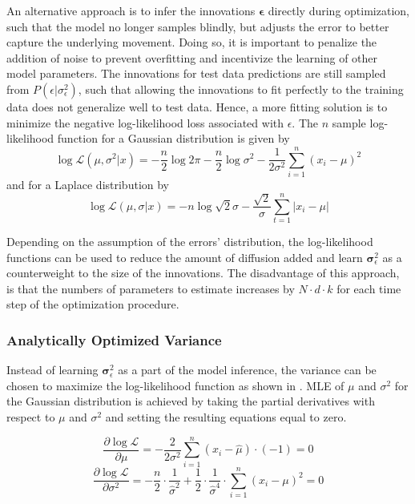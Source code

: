        An alternative approach is to infer the innovations $\bm{\epsilon}$ directly during optimization, such that the model no longer samples blindly, but adjusts the error to better capture the underlying movement. 
        Doing so, it is important to penalize the addition of noise to prevent overfitting and incentivize the learning of other model parameters. The innovations for test data predictions are still sampled from $P(\epsilon|\sigma_\epsilon^2)$, such that allowing the innovations to fit perfectly to the training data does not generalize well to test data. Hence, a more fitting solution is to minimize the negative log-likelihood loss associated with $\epsilon$. The $n$ sample log-likelihood function for a Gaussian distribution is given by
        \begin{equation}\label{error-gaussian-log-loss}
            \log\mathcal{L}(\mu, \sigma^2\vert x) = -\frac{n}{2}\log2\pi - \frac{n}{2}\log\sigma^2 - \frac{1}{2\sigma^2}\sum_{i=1}^n (x_i - \mu)^2
        \end{equation}
        and for a Laplace distribution by
        \begin{equation}\label{error-laplace-log-loss}
            \log\mathcal{L}(\mu,\sigma\vert x)=-n\log\sqrt{2}\sigma -\frac{\sqrt{2}}{\sigma}\sum_{t=1}^n |x_i-\mu|
        \end{equation}
    
        Depending on the assumption of the errors' distribution, the log-likelihood functions can be used to reduce the amount of diffusion added and learn $\bm{\sigma}_\epsilon^2$ as a counterweight to the size of the innovations. The disadvantage of this approach, is that the numbers of parameters to estimate increases by $N\cdot d\cdot k$ for each time step of the optimization procedure.
        
    \subsubsection{Analytically Optimized Variance}
        
        Instead of learning $\bm{\sigma}_\epsilon^2$ as a part of the model inference, the variance can be chosen to maximize the log-likelihood function as shown in \cite{haerdle2015statistics}. MLE of $\mu$ and $\sigma^2$ for the Gaussian distribution is achieved by taking the partial derivatives with respect to $\mu$ and $\sigma^2$ and setting the resulting equations equal to zero.
        
        \begin{equation}\label{error-mu-partial}
            \frac{\partial\log\mathcal{L}}{\partial\mu} = -\frac{2}{2\sigma^2}\sum_{i=1}^n(x_i-\hat{\mu})\cdot(-1) = 0
        \end{equation}
        \begin{equation}\label{error-sigma-partial}
            \frac{\partial\log\mathcal{L}}{\partial\sigma^2} = -\frac{n}{2}\cdot\frac{1}{\hat{\sigma}^2}+\frac{1}{2}\cdot\frac{1}{\hat{\sigma}^4}\cdot\sum_{i=1}^n(x_i-\mu)^2 = 0
        \end{equation}
        

